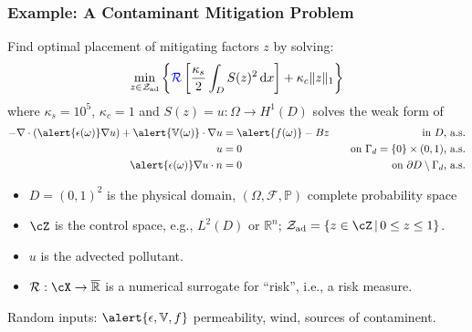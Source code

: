 \documentclass[aspectratio=169,xcolor=dvipsnames,10pt]{beamer}
\newcommand{\bbp}{\mathbb{P}}
\newcommand{\cF}{\mathcal{F}}
\newcommand{\Zad}{\mathcal{Z}_{\text{\textup{ad}}}}
\newcommand{\risk}{\mathcal{R}}
\begin{document}
\begin{frame}\frametitle{Example: A Contaminant Mitigation Problem}
\begin{block}{}
Find optimal placement of mitigating factors $z$ by solving:
\begin{equation*}\label{eq:optprob_ex2}
  \min_{z\in\Zad}\left\{
    {\color{blue}\risk}\left[\frac{\kappa_s}{2}\int_{D} S(z)^2\,\mathrm{d}x\right]
       + \kappa_c \|z\|_1\right\}
\end{equation*}
where
 $\kappa_s = 10^5$, $\kappa_c =1$ and $S(z) = u:\Omega\to H^1(D)$ solves
the weak form of
\begin{align*}
  -\nabla\cdot(\alert{\epsilon(\omega)}\nabla u) + \alert{\mathbb{V}(\omega)}\cdot\nabla u
    &= \alert{f(\omega)} - Bz &\quad\text{in $D$, a.s.}\\
  u &=0 &\quad \text{on $\Gamma_d = \{0\}\times(0,1)$, a.s.} \\
 \alert{ \epsilon(\omega)}\nabla u\cdot n &= 0 &\quad\text{on $\partial D\setminus\Gamma_d$, a.s.}
\end{align*}
\begin{itemize}\vspace*{-3ex}
\item $D = (0,1)^2$ is the physical domain, $(\Omega,\cF, \bbp)$ complete probability space
\item $\cZ$ is the control space, e.g., $L^2(D)$ or $\mathbb R^n$; $\Zad = \{z\in \cZ\,\vert\,0\le z\le 1\}$.
\item $u$ is the advected pollutant.
\item $\risk : \cX \to \overline{\mathbb R}$ is a numerical surrogate for ``risk'', i.e., a risk measure.
\end{itemize}
Random inputs: $\alert{\epsilon, \mathbb V, f}$ permeability, wind, sources of contaminent.
\end{block}
\end{frame}
\end{document}
